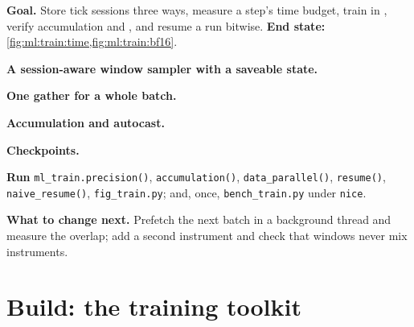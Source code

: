 \begin{tutorial}
\textbf{Goal.} Store tick sessions three ways, measure a step's time budget, train in , verify accumulation and , and resume a run bitwise. \textbf{End state:} \cref{fig:ml:train:time,fig:ml:train:bf16}.
\begin{tutsteps}
\item \textbf{A session-aware window sampler with a saveable state.}
\label{lst:ml:train:sampler}
\item \textbf{One gather for a whole batch.}
\label{lst:ml:train:gather}
\item \textbf{Accumulation and  autocast.}
\label{lst:ml:train:loop}
\item \textbf{Checkpoints.}
\label{lst:ml:train:ckpt}
\item \textbf{Run} \texttt{ml\_train.precision()}, \texttt{accumulation()}, \texttt{data\_parallel()}, \texttt{resume()},
\texttt{naive\_resume()}, \texttt{fig\_train.py}; and, once, \texttt{bench\_train.py} under \texttt{nice}.
\end{tutsteps}
\textbf{What to change next.} Prefetch the next batch in a background thread and measure the overlap; add a second instrument
and check that windows never mix instruments.
\end{tutorial}

\section{Build: the training toolkit}\label{bld:ml:training-infrastructure:mltrain}


